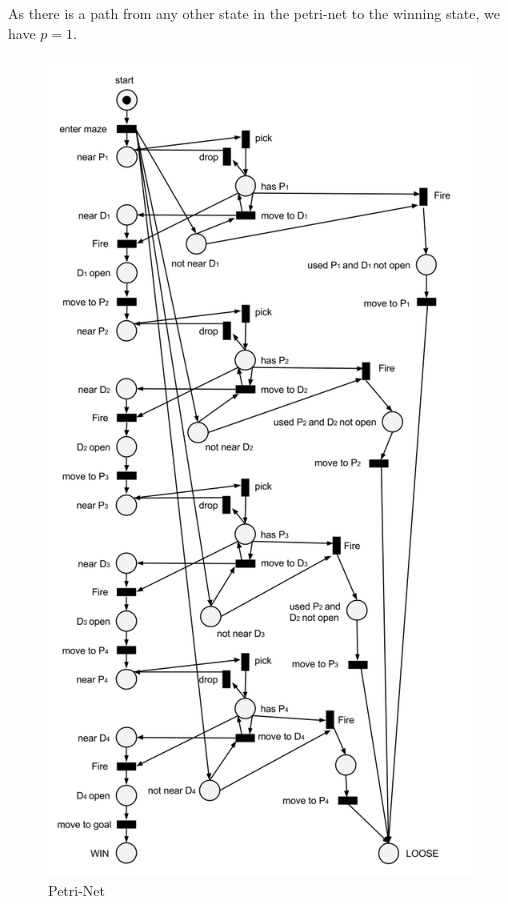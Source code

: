 \documentclass[13pt]{article}
\begin{document}
As there is a path from any other state in the petri-net to the winning state, we have $p=1$.

\begin{figure}[ht!]
\center
 \caption{Petri-Net}
	\includegraphics[width=115mm]{petri-net.png}
\end{figure}
\end{document}
